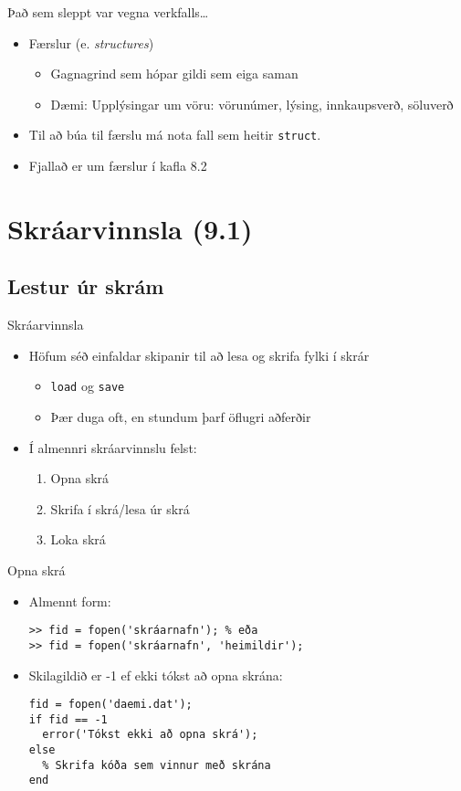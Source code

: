 \documentclass{beamer}
\begin{document}
\begin{frame}{Það sem sleppt var vegna verkfalls\ldots}
\begin{itemize}
 \item Færslur (e. \emph{structures})
 \begin{itemize}
  \item Gagnagrind sem hópar gildi sem eiga saman
  \item Dæmi: Upplýsingar um vöru: vörunúmer, lýsing, innkaupsverð, söluverð
 \end{itemize}
 \item Til að búa til færslu má nota fall sem heitir \texttt{struct}.
 \item Fjallað er um færslur í kafla 8.2
\end{itemize}
\end{frame}

\section{Skráarvinnsla (9.1)}

\subsection{Lestur úr skrám}

\begin{frame}{Skráarvinnsla}
\begin{itemize}
 \item Höfum séð einfaldar skipanir til að lesa og skrifa fylki í skrár
 \begin{itemize}
  \item \texttt{load} og \texttt{save}
  \item Þær duga oft, en stundum þarf öflugri aðferðir
 \end{itemize}
 \item Í almennri skráarvinnslu felst:
 \begin{enumerate}
  \item Opna skrá
  \item Skrifa í skrá/lesa úr skrá
  \item Loka skrá
 \end{enumerate}
\end{itemize}
\end{frame}

\begin{frame}[fragile]{Opna skrá}
\begin{itemize}
 \item Almennt form:
\begin{verbatim}
>> fid = fopen('skráarnafn'); % eða
>> fid = fopen('skráarnafn', 'heimildir');
\end{verbatim}
 \item Skilagildið er -1 ef ekki tókst að opna skrána:
\begin{verbatim}
fid = fopen('daemi.dat');
if fid == -1
  error('Tókst ekki að opna skrá');
else
  % Skrifa kóða sem vinnur með skrána
end
\end{verbatim}
\end{itemize}
\end{frame}
\end{document}
